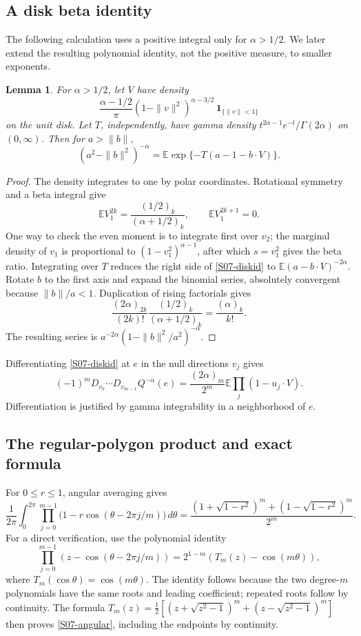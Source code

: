 \documentclass[11pt,a4paper]{article}
\newtheorem{lemma}[theorem]{Lemma}
\theoremstyle{definition}\newtheorem{definition}[theorem]{Definition}
\theoremstyle{remark}\newtheorem{remark}[theorem]{Remark}
\numberwithin{equation}{section}
\begin{document}
\subsection{A disk beta identity}\label{S07-sec-3}
The following calculation uses a positive integral only for $\alpha>1/2$. We later extend the resulting polynomial identity, not the positive measure, to smaller exponents.
\begin{lemma}\label{S07-disk}
For $\alpha>1/2$, let $V$ have density
\[
 \frac{\alpha-1/2}{\pi}(1-\|v\|^2)^{\alpha-3/2}\,\mathbf1_{\{\|v\|<1\}}
\]
on the unit disk. Let $T$, independently, have gamma density $t^{2\alpha-1}e^{-t}/\Gamma(2\alpha)$ on $(0,\infty)$. Then for $a>\|b\|$,
\begin{equation}\label{S07-diskid}
 (a^2-\|b\|^2)^{-\alpha}
 =\mathbb E\exp\{-T(a-1-b\cdot V)\}.
\end{equation}
\end{lemma}
\begin{proof}
The density integrates to one by polar coordinates. Rotational symmetry and a beta integral give
\[
 \mathbb E V_1^{2k}=\frac{(1/2)_k}{(\alpha+1/2)_k},\qquad
 \mathbb E V_1^{2k+1}=0.
\]
One way to check the even moment is to integrate first over $v_2$; the marginal density of $v_1$ is proportional to $(1-v_1^2)^{\alpha-1}$, after which $s=v_1^2$ gives the beta ratio. Integrating over $T$ reduces the right side of \eqref{S07-diskid} to $\mathbb E(a-b\cdot V)^{-2\alpha}$. Rotate $b$ to the first axis and expand the binomial series, absolutely convergent because $\|b\|/a<1$. Duplication of rising factorials gives
\[
 \frac{(2\alpha)_{2k}}{(2k)!}
 \frac{(1/2)_k}{(\alpha+1/2)_k}
 =\frac{(\alpha)_k}{k!}.
\]
The resulting series is $a^{-2\alpha}(1-\|b\|^2/a^2)^{-\alpha}$.
\end{proof}
Differentiating \eqref{S07-diskid} at $e$ in the null directions $v_j$ gives
\begin{equation}\label{S07-moment}
 (-1)^mD_{v_0}\cdots D_{v_{m-1}}Q^{-\alpha}(e)
 =\frac{(2\alpha)_m}{2^m}\mathbb E\prod_j(1-u_j\cdot V).
\end{equation}
Differentiation is justified by gamma integrability in a neighborhood of $e$.

\subsection{The regular-polygon product and exact formula}\label{S07-sec-4}
For $0\le r\le1$, angular averaging gives
\begin{equation}\label{S07-angular}
 \frac1{2\pi}\int_0^{2\pi}\prod_{j=0}^{m-1}
 \bigl(1-r\cos(\theta-2\pi j/m)\bigr)\,d\theta
 =\frac{(1+\sqrt{1-r^2})^m+(1-\sqrt{1-r^2})^m}{2^m}.
\end{equation}
For a direct verification, use the polynomial identity
\[
 \prod_{j=0}^{m-1}(z-\cos(\theta-2\pi j/m))
 =2^{1-m}(T_m(z)-\cos(m\theta)),
\]
where $T_m(\cos\theta)=\cos(m\theta)$. The identity follows because the two degree-$m$ polynomials have the same roots and leading coefficient; repeated roots follow by continuity. The formula
$T_m(z)=\tfrac12[(z+\sqrt{z^2-1})^m+(z-\sqrt{z^2-1})^m]$
then proves \eqref{S07-angular}, including the endpoints by continuity.
\end{document}
